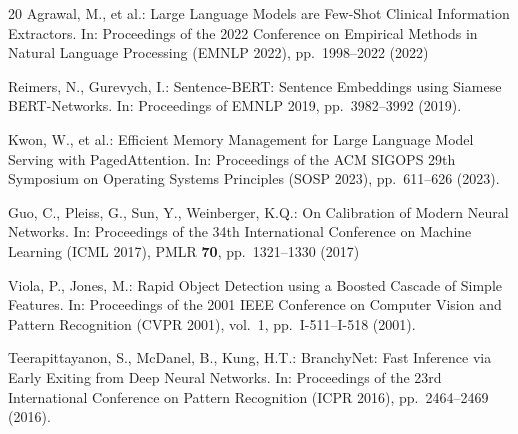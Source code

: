 \documentclass[runningheads]{llncs}
\begin{document}
\begin{thebibliography}{20}
Agrawal, M., et al.: Large Language Models are Few-Shot Clinical
Information Extractors.
In: Proceedings of the 2022 Conference on Empirical Methods in Natural
Language Processing (EMNLP 2022), pp.~1998--2022 (2022)

Reimers, N., Gurevych, I.: Sentence-BERT: Sentence Embeddings using
Siamese BERT-Networks.
In: Proceedings of EMNLP 2019, pp.~3982--3992 (2019).

Kwon, W., et al.: Efficient Memory Management for Large Language Model
Serving with PagedAttention.
In: Proceedings of the ACM SIGOPS 29th Symposium on Operating Systems
Principles (SOSP 2023), pp.~611--626 (2023). 

Guo, C., Pleiss, G., Sun, Y., Weinberger, K.Q.: On Calibration of Modern
Neural Networks. In: Proceedings of the 34th International Conference on
Machine Learning (ICML 2017), PMLR \textbf{70}, pp.~1321--1330 (2017)

Viola, P., Jones, M.: Rapid Object Detection using a Boosted Cascade of
Simple Features. In: Proceedings of the 2001 IEEE Conference on Computer
Vision and Pattern Recognition (CVPR 2001), vol.~1, pp.~I-511--I-518 (2001).

Teerapittayanon, S., McDanel, B., Kung, H.T.: BranchyNet: Fast Inference
via Early Exiting from Deep Neural Networks. In: Proceedings of the 23rd
International Conference on Pattern Recognition (ICPR 2016),
pp.~2464--2469 (2016). 

\end{thebibliography}
\end{document}
